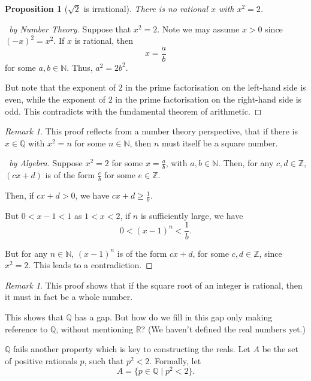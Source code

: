 \documentclass{article}
\newtheorem{proposition}[theorem]{Proposition}
\theoremstyle{definition}
\theoremstyle{remark}
\newtheorem{remark}[theorem]{Remark}
\newcommand{\pqty}[1]{\left(#1\right)}
\newcommand{\set}[2]{\{#1\mid #2\}}
\newcommand{\NN}{\mathbb{N}}
\newcommand{\ZZ}{\mathbb{Z}}
\newcommand{\QQ}{\mathbb{Q}}
\newcommand{\RR}{\mathbb{R}}
\begin{document}
\begin{proposition}[\(\sqrt{2}\) is irrational]
    There is no rational \(x\) with \(x^2 = 2\).    
\end{proposition}

\begin{proof}[\proofname\ by Number Theory]
    Suppose that \(x^2 = 2\). Note we may assume \(x > 0\) since \(\pqty{-x}^2 = x^2\). If \(x\) is rational, then
    \[
        x = \frac{a}{b}
    \]
    for some \(a, b \in \NN\). Thus, \(a^2 = 2b^2\).

    But note that the exponent of \(2\) in the prime factorisation on the left-hand side is even, while the exponent of \(2\) in the prime factorisation on the right-hand side is odd. This contradicts with the fundamental theorem of arithmetic.
\end{proof}

\begin{remark}
    This proof reflects from a number theory perspective, that if there is \(x \in \QQ\) with \(x^2 = n\) for some \(n \in \NN\), then \(n\) must itself be a square number.
\end{remark}

\begin{proof}[\proofname\ by Algebra]
    Suppose \(x^2 = 2\) for some \(x = \frac{a}{b}\), with \(a, b \in \NN\). Then, for any \(c, d \in \ZZ\), \(\pqty{cx + d}\) is of the form \(\frac{e}{b}\) for some \(e \in \ZZ\).

    Then, if \(cx + d > 0\), we have \(cx + d \geq \frac{1}{b}\).

    But \(0 < x - 1 < 1\) as \(1 < x < 2\), if \(n\) is sufficiently large, we have
    \[
        0 < \pqty{x - 1}^n < \frac{1}{b}.
    \]

    But for any \(n \in \NN\), \(\pqty{x - 1}^n\) is of the form \(cx + d\), for some \(c, d \in \ZZ\), since \(x^2 = 2\). This leads to a contradiction.
\end{proof}

\begin{remark}
    This proof shows that if the square root of an integer is rational, then it must in fact be a whole number.
\end{remark}

This shows that \(\QQ\) has a gap. But how do we fill in this gap only making reference to \(\QQ\), without mentioning \(\RR\)? (We haven't defined the real numbers yet.)

\(\QQ\) fails another property which is key to constructing the reals. Let \(A\) be the set of positive rationals \(p\), such that \(p^2 < 2\). Formally, let
\[
    A = \set{p \in \QQ}{p^2 < 2}.
\]
\end{document}
